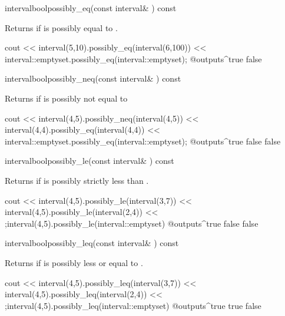 \documentclass{manual}
\let\leq=\leqslant
\begin{document}
\begin{defmethod}{interval}{bool}{possibly\_eq}{(const interval\& ) const}
  \begin{operation}
  \end{operation}
Returns  if  is possibly equal to .
\begin{example}
cout << interval(5,10).possibly_eq(interval(6,100))
     << interval::emptyset.possibly_eq(interval::emptyset);
@outputs^true false~
\end{example}
\end{defmethod}

\begin{defmethod}{interval}{bool}{possibly\_neq}{(const interval\& ) const}
  \begin{operation}
  \end{operation}
Returns  if  is possibly not equal to 
\begin{example}
cout << interval(4,5).possibly_neq(interval(4,5))
     << interval(4,4).possibly_eq(interval(4,4))
     << interval::emptyset.possibly_eq(interval::emptyset);
@outputs^true false false~
\end{example}
\end{defmethod}

\begin{defmethod}{interval}{bool}{possibly\_le}{(const interval\& ) const}
  \begin{operation}
  \end{operation}
Returns  if  is possibly strictly less than .
\begin{example}
cout << interval(4,5).possibly_le(interval(3,7))
     << interval(4,5).possibly_le(interval(2,4))
     << ;interval(4,5).possibly_le(interval::emptyset)
@outputs^true false false~
\end{example}
\end{defmethod}

\begin{defmethod}{interval}{bool}{possibly\_leq}{(const interval\& ) const}
  \begin{operation}
    \op{$\exists x\in \code{self}, \exists y \in \var{I}\colon x\leq y$}
  \end{operation}
  Returns  if  is possibly less or equal to .
\begin{example}
cout << interval(4,5).possibly_leq(interval(3,7))
     << interval(4,5).possibly_leq(interval(2,4))
     << ;interval(4,5).possibly_leq(interval::emptyset)
@outputs^true true false~
\end{example}
\end{defmethod}
\end{document}
